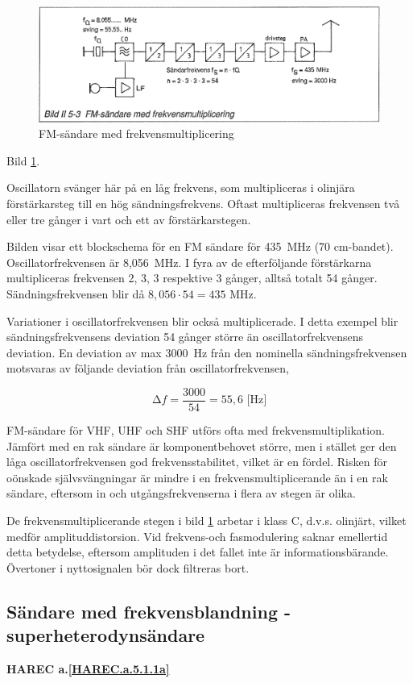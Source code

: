 \begin{figure}
  \includegraphics[width=\textwidth]{images/bild_2_5-03}
  \caption{FM-sändare med frekvensmultiplicering}
  \label{fig:bildII5-3}
\end{figure}

Bild \ref{fig:bildII5-3}.

Oscillatorn svänger här på en låg frekvens, som multipliceras i
olinjära förstärkarsteg till en hög sändningsfrekvens. Oftast
multipliceras frekvensen två eller tre gånger i vart och ett av
förstärkarstegen.

Bilden visar ett blockschema för en FM sändare för 435~MHz (70
cm-bandet). Oscillatorfrekvensen är 8,056~MHz. I fyra av de
efterföljande förstärkarna multipliceras frekvensen 2, 3, 3 respektive
3 gånger, alltså totalt 54 gånger. Sändningsfrekvensen blir då \(8,056
\cdot 54 = 435\) MHz.

Variationer i oscillatorfrekvensen blir också multiplicerade. I detta
exempel blir sändningsfrekvensens deviation 54 gånger större än
oscillatorfrekvensens deviation. En deviation av max 3000~Hz från den
nominella sändningsfrekvensen motsvaras av följande deviation från
oscillatorfrekvensen,

\[∆f = \frac{3000}{54} = 55,6\text{ [Hz]}\]

FM-sändare för VHF, UHF och SHF utförs ofta med
frekvensmultiplikation. Jämfört med en rak sändare är komponentbehovet
större, men i stället ger den låga oscillatorfrekvensen god
frekvensstabilitet, vilket är en fördel. Risken för oönskade
självsvängningar är mindre i en frekvensmultiplicerande än i en rak
sändare, eftersom in och utgångsfrekvenserna i flera av stegen är
olika.

De frekvensmultiplicerande stegen i bild \ref{fig:bildII5-3} arbetar i klass C,
d.v.s. olinjärt, vilket medför amplituddistorsion. Vid frekvens-och
fasmodulering saknar emellertid detta betydelse, eftersom amplituden i
det fallet inte är informationsbärande. Övertoner i nyttosignalen bör
dock filtreras bort.

\subsection{Sändare med frekvensblandning - superheterodynsändare}
\textbf{HAREC a.\ref{HAREC.a.5.1.1a}\label{myHAREC.a.5.1.1a}}

